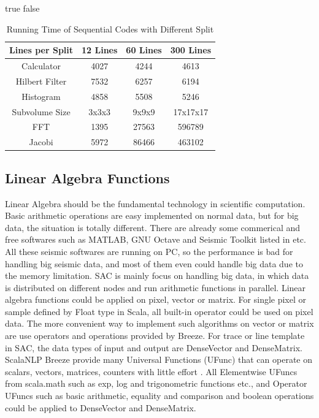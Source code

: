 \ifx true false
\begin{table}[H]
\caption{Running Time of Sequential Codes with Different Split}
\centering
\begin{tabular}{||c| c c c ||} 
 \hline
 Lines per Split & 12 Lines & 60 Lines & 300 Lines \\ [0.5ex] 
 \hline
 Calculator & 4027 & 4244 & 4613 \\ 
 Hilbert Filter & 7532 & 6257 & 6194 \\
 Histogram & 4858 & 5508 & 5246 \\
 \hline
 \hline
 Subvolume Size & 3x3x3 & 9x9x9 & 17x17x17 \\ [0.5ex] 
 \hline
 FFT & 1395 & 27563 & 596789 \\
 Jacobi & 5972 & 86466 & 463102 \\
 \hline
\end{tabular}
\label{table:CalcSpark}
\end{table}
\fi

\subsection{Linear Algebra Functions}
Linear Algebra should be the fundamental technology in scientific computation. Basic arithmetic operations are easy implemented on normal data, but for big data, the situation is totally different. There are already some commerical and free softwares such as MATLAB, GNU Octave and Seismic Toolkit listed in \cite{SeismicCalculator} etc. All these seismic softwares are running on PC, so the performance is bad for handling big seismic data, and most of them even could handle big data due to the memory limitation. SAC is mainly focus on handling big data, in which data is distributed on different nodes and run arithmetic functions in parallel. Linear algebra functions could be applied on pixel, vector or matrix. For single pixel or sample defined by Float type in Scala, all built-in operator could be used on pixel data. The more convenient way to implement such algorithms on vector or matrix are use operators and operations provided by Breeze. For trace or line template in SAC, the data types of input and output are DenseVector and DenseMatrix. ScalaNLP Breeze provide many Universal Functions (UFunc) that can operate on scalars, vectors, matrices, counters with little effort \cite{BreezeUFunc}. All Elementwise UFuncs from scala.math such as exp, log and trigonometric functions etc., and Operator UFuncs such as basic arithmetic, equality and comparison and boolean operations could be applied to DenseVector and DenseMatrix.  

